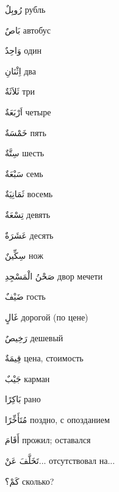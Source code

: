 \documentclass[a5paper]{article}
\newcommand\textstyleDropCaps[1]{#1}
\newcommand\textstyleCaptioncharacters[1]{#1}
\begin{document}
\textstyleCaptioncharacters{رُوبِلٌ }\textstyleDropCaps{рубль‎}

\textstyleCaptioncharacters{بَاصٌ }\textstyleDropCaps{автобус‎}

\textstyleCaptioncharacters{وَاحِدٌ }\textstyleDropCaps{один‎}

\textstyleCaptioncharacters{اِثْنَانِ }\textstyleDropCaps{два‎}

\textstyleCaptioncharacters{ثَلاَثَةٌ }\textstyleDropCaps{три‎}

\textstyleCaptioncharacters{اَرْبَعَةٌ }\textstyleDropCaps{четыре‎}

\textstyleCaptioncharacters{خَمْسَةٌ }\textstyleDropCaps{пять‎}

\textstyleCaptioncharacters{سِتَّةٌ }\textstyleDropCaps{шесть‎}

\textstyleCaptioncharacters{سَبْعَةٌ }\textstyleDropCaps{семь‎}

\textstyleCaptioncharacters{ثَمَانِيَةٌ }\textstyleDropCaps{восемь‎}

\textstyleCaptioncharacters{تِسْعَةٌ }\textstyleDropCaps{девять‎}

\textstyleCaptioncharacters{عَشَرَةٌ }\textstyleDropCaps{десять‎}

\textstyleCaptioncharacters{سِكِّينٌ }\textstyleDropCaps{нож‎}

\textstyleCaptioncharacters{صَحْنُ الْمَسْجِدِ }\textstyleDropCaps{двор мечети‎}

\textstyleCaptioncharacters{ضَيْفٌ }\textstyleDropCaps{гость‎}

\textstyleCaptioncharacters{غَالٍ }\textstyleDropCaps{дорогой (по цене)‎}

\textstyleCaptioncharacters{رَخِيصٌ }\textstyleDropCaps{дешевый‎}

\textstyleCaptioncharacters{قِيمَةٌ }\textstyleDropCaps{цена, стоимость‎}

\textstyleCaptioncharacters{جَيْبٌ }\textstyleDropCaps{карман‎}

\textstyleCaptioncharacters{بَاكِرًا }\textstyleDropCaps{рано‎}

\textstyleCaptioncharacters{مُتَأَخِّرًا }\textstyleDropCaps{поздно, с опозда­нием‎}

\textstyleCaptioncharacters{أَقَامَ }\textstyleDropCaps{прожил; оставался‎}

\textstyleCaptioncharacters{تَخَلَّفَ عَنْ...ِ }\textstyleDropCaps{отсутство­вал на...‎}

\textstyleCaptioncharacters{كَمْ؟ }\textstyleDropCaps{сколько?‎}
\end{document}
